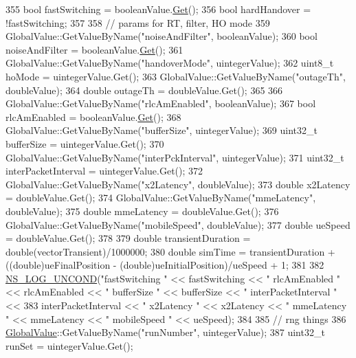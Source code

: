 \begin{DoxyCode}
355   \textcolor{keywordtype}{bool} fastSwitching = booleanValue.\hyperlink{classns3_1_1BooleanValue_a15d5d96abfd11676964f40859442ec12}{Get}();
356   \textcolor{keywordtype}{bool} hardHandover = !fastSwitching;
357 
358   \textcolor{comment}{// params for RT, filter, HO mode}
359   GlobalValue::GetValueByName(\textcolor{stringliteral}{"noiseAndFilter"}, booleanValue);
360   \textcolor{keywordtype}{bool} noiseAndFilter = booleanValue.\hyperlink{classns3_1_1BooleanValue_a15d5d96abfd11676964f40859442ec12}{Get}();
361   GlobalValue::GetValueByName(\textcolor{stringliteral}{"handoverMode"}, uintegerValue);
362   uint8\_t hoMode = uintegerValue.Get();
363   GlobalValue::GetValueByName(\textcolor{stringliteral}{"outageTh"}, doubleValue);
364   \textcolor{keywordtype}{double} outageTh = doubleValue.Get();
365 
366   GlobalValue::GetValueByName(\textcolor{stringliteral}{"rlcAmEnabled"}, booleanValue);
367   \textcolor{keywordtype}{bool} rlcAmEnabled = booleanValue.\hyperlink{classns3_1_1BooleanValue_a15d5d96abfd11676964f40859442ec12}{Get}();
368   GlobalValue::GetValueByName(\textcolor{stringliteral}{"bufferSize"}, uintegerValue);
369   uint32\_t bufferSize = uintegerValue.Get();
370   GlobalValue::GetValueByName(\textcolor{stringliteral}{"interPckInterval"}, uintegerValue);
371   uint32\_t interPacketInterval = uintegerValue.Get();
372   GlobalValue::GetValueByName(\textcolor{stringliteral}{"x2Latency"}, doubleValue);
373   \textcolor{keywordtype}{double} x2Latency = doubleValue.Get();
374   GlobalValue::GetValueByName(\textcolor{stringliteral}{"mmeLatency"}, doubleValue);
375   \textcolor{keywordtype}{double} mmeLatency = doubleValue.Get();
376   GlobalValue::GetValueByName(\textcolor{stringliteral}{"mobileSpeed"}, doubleValue);
377   \textcolor{keywordtype}{double} ueSpeed = doubleValue.Get();
378 
379   \textcolor{keywordtype}{double} transientDuration = double(vectorTransient)/1000000; 
380   \textcolor{keywordtype}{double} simTime = transientDuration + ((double)ueFinalPosition - (\textcolor{keywordtype}{double})ueInitialPosition)/ueSpeed + 1;
381 
382   \hyperlink{log-macros-disabled_8h_a0b36e5e182b37194f85ef1c5e979fb2e}{NS\_LOG\_UNCOND}("fastSwitching " << fastSwitching << " rlcAmEnabled " << rlcAmEnabled << " 
      bufferSize " << bufferSize << " interPacketInterval " << 
383       interPacketInterval << " x2Latency " << x2Latency << " mmeLatency " << mmeLatency << " mobileSpeed " 
      << ueSpeed);
384 
385   \textcolor{comment}{// rng things}
386   \hyperlink{classns3_1_1GlobalValue}{GlobalValue}::GetValueByName("runNumber", uintegerValue);
387   uint32\_t runSet = uintegerValue.Get();

\end{DoxyCode}
